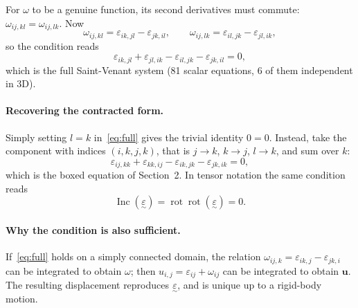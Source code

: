 \documentclass[11pt,a4paper]{article}
\newcommand{\eps}{\varepsilon}
\newcommand{\teps}{\underset{\sim}{\varepsilon}}
\newcommand{\rot}{\operatorname{rot}}
\newcommand{\Inc}{\operatorname{Inc}}
\begin{document}
For $\omega$ to be a genuine function, its second derivatives must commute: $\omega_{ij,kl}=\omega_{ij,lk}$. Now
\[
  \omega_{ij,kl}=\eps_{ik,jl}-\eps_{jk,il},\qquad
  \omega_{ij,lk}=\eps_{il,jk}-\eps_{jl,ik},
\]
so the condition reads
\begin{equation}\label{eq:full}
  \eps_{ik,jl}+\eps_{jl,ik}-\eps_{il,jk}-\eps_{jk,il}=0,
\end{equation}
which is the full Saint-Venant system (81 scalar equations, 6 of them independent in 3D).

\paragraph{Recovering the contracted form.}
Simply setting $l=k$ in~\eqref{eq:full} gives the trivial identity $0=0$. Instead, take the component with indices $(i,k,j,k)$, that is $j\to k$, $k\to j$, $l\to k$, and sum over $k$:
\[
  \eps_{ij,kk}+\eps_{kk,ij}-\eps_{ik,jk}-\eps_{jk,ik}=0,
\]
which is the boxed equation of Section~2. In tensor notation the same condition reads
\[
  \Inc(\teps)=\rot\rot(\teps)=0.
\]

\paragraph{Why the condition is also sufficient.}
If~\eqref{eq:full} holds on a simply connected domain, the relation $\omega_{ij,k}=\eps_{ik,j}-\eps_{jk,i}$ can be integrated to obtain $\omega$; then $u_{i,j}=\eps_{ij}+\omega_{ij}$ can be integrated to obtain $\boldsymbol u$. The resulting displacement reproduces $\teps$, and is unique up to a rigid-body motion.
\end{document}
